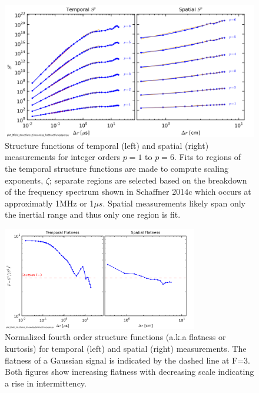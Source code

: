 \documentclass[aps,prl,amsmath,amssymb,reprint,superscriptaddress]{revtex4-1} %
\begin{document}
\begin{figure}[!htbp]
\centerline{
\includegraphics[width=17cm]{Bmod_timeandspace_StructureFunction100313Shots41to80_forStructFuncpaper.png}}
\caption{\label{fig:structfuncs} Structure functions of temporal (left) and spatial (right) measurements for integer orders $p=1$ to $p=6$. Fits to regions of the temporal structure functions are made to compute scaling exponents, $\zeta$; separate regions are selected based on the breakdown of the frequency spectrum shown in Schaffner 2014c which occurs at approximatly 1MHz or 1$\mu s$. Spatial measurements likely span only the inertial range and thus only one region is fit. }
\end{figure}

\begin{figure}[!htbp]
\centerline{
\includegraphics[width=8.5cm]{Bmod_timeandspace_Flatness100313Shots41to80_forStructFuncpaper.png}}
\caption{\label{fig:flatness} Normalized fourth order structure functions (a.k.a flatness or kurtosis) for temporal (left) and spatial (right) measurements. The flatness of a Gaussian signal is indicated by the dashed line at F=3. Both figures show increasing flatness with decreasing scale indicating a rise in intermittency.}
\end{figure}
\end{document}
